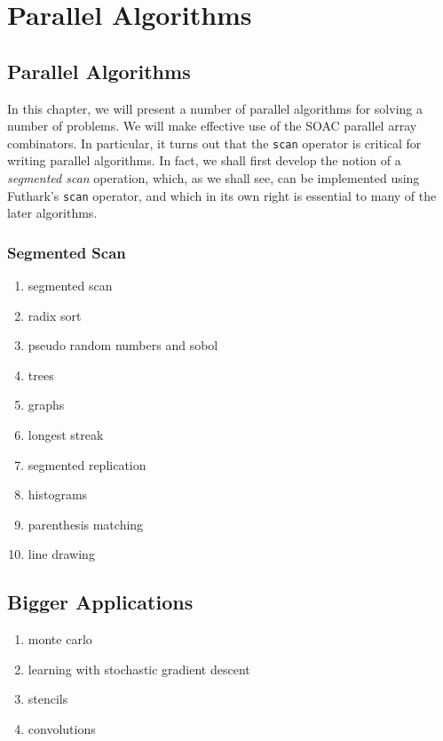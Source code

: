 \documentclass[11pt]{book}
\newcommand{\soac}[1]{\texttt{\color{eclipseBlue}#1}}
\begin{document}
\part{Parallel Algorithms}

\chapter{Parallel Algorithms}
\label{chap:parallel-algorithms}

In this chapter, we will present a number of parallel algorithms for
solving a number of problems. We will make effective use of the
SOAC parallel array combinators. In particular, it turns out that the
\soac{scan} operator is critical for writing parallel algorithms. In
fact, we shall first develop the notion of a \emph{segmented scan}
operation, which, as we shall see, can be implemented using Futhark's \soac{scan}
operator, and which in its own right is essential to many of the later
algorithms.

\section{Segmented Scan}



\begin{enumerate}
\item segmented scan
\item radix sort

\item pseudo random numbers and sobol
\item trees
\item graphs
\item longest streak
\item segmented replication
\item histograms
\item parenthesis matching
\item line drawing
\end{enumerate}

\chapter{Bigger Applications}
\begin{enumerate}
\item monte carlo
\item learning with stochastic gradient descent
\item stencils
\item convolutions
\end{enumerate}
\end{document}
